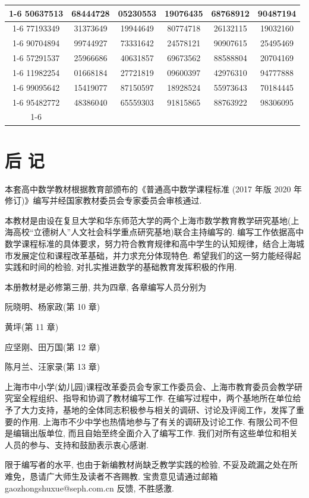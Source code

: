 \documentclass[10pt]{article}
\begin{document}
\begin{center}
{\begin{tabular}{|c|c|c|c|c|c|}
\cline{1-6}
50637513 & 68444728 & 05230553 & 19076435 & 68768912 & 90487194 \\
\cline{1-6}
77193349 & 31373649 & 19944649 & 80774718 & 26132115 & 19032160 \\
\cline{1-6}
90704894 & 99744927 & 73331642 & 24578121 & 90907615 & 25495469 \\
\cline{1-6}
57291537 & 25966686 & 40631857 & 69673562 & 88588804 & 20704169 \\
\cline{1-6}
11982254 & 01668184 & 27721819 & 09600397 & 42976310 & 94777888 \\
\cline{1-6}
99095642 & 15419077 & 87150597 & 18928524 & 55973643 & 70184445 \\
\cline{1-6}
95482772 & 48386040 & 65559303 & 91815865 & 88763922 & 98306095 \\
\cline{1-6}
\hline
\end{tabular}
}
\end{center}



\section*{后 记}

本套高中数学教材根据教育部颁布的《普通高中数学课程标准 (2017 年版 2020 年修订)》编写并经国家教材委员会专家委员会审核通过.

本教材是由设在复旦大学和华东师范大学的两个上海市数学教育教学研究基地(上海高校“立德树人”人文社会科学重点研究基地)联合主持编写的. 编写工作依据高中数学课程标准的具体要求，努力符合教育规律和高中学生的认知规律，结合上海城市发展定位和课程改革基础，并力求充分体现特色. 希望我们的这一努力能经得起实践和时间的检验, 对扎实推进数学的基础教育发挥积极的作用.

本册教材是必修第三册, 共为四章, 各章编写人员分别为

阮晓明、杨家政(第 10 章)

黄坪(第 11 章)

应坚刚、田万国(第 12 章)

陈月兰、汪家录(第 13 章)

上海市中小学(幼儿园)课程改革委员会专家工作委员会、上海市教育委员会教学研究室全程组织、指导和协调了教材编写工作. 在编写过程中，两个基地所在单位给予了大力支持，基地的全体同志积极参与相关的调研、讨论及评阅工作，发挥了重要的作用. 上海市不少中学也热情地参与了有关的调研及讨论工作. 有限公司不但是编辑出版单位, 而且自始至终全面介入了编写工作. 我们对所有这些单位和相关人员的参与、支持和鼓励表示衷心感谢.

限于编写者的水平, 也由于新编教材尚缺乏教学实践的检验, 不妥及疏漏之处在所难免，恳请广大师生及读者不吝赐教. 宝贵意见请通过邮箱 gaozhongshuxue@seph.com.cn 反馈, 不胜感激.
\end{document}
